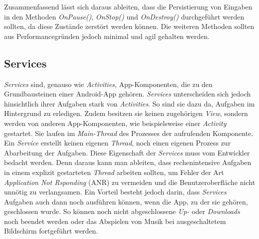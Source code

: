 Zusammenfassend lässt sich daraus ableiten, dass die Persistierung von Eingaben in den Methoden \textit{OnPause()}, \textit{OnStop()} und \textit{OnDestroy()} durchgeführt werden sollten, da diese Zustände zerstört werden können. Die weiteren Methoden sollten aus Performancegründen jedoch minimal und agil gehalten werden.
\subsection{Services}
\label{ssec:android-services}
\textit{Services} sind, genauso wie \textit{Activities}, App-Komponenten, die zu den Grundbausteinen einer Android-App gehören. \textit{Services} unterscheiden sich jedoch hinsichtlich ihrer Aufgaben stark von \textit{Activities}. So sind sie dazu da, Aufgaben im Hintergrund zu erledigen. Zudem besitzen sie keinen zugehörigen \textit{View}, sondern werden von anderen App-Komponenten, wie beispielsweise einer \textit{Activity} gestartet. Sie laufen im \textit{Main-Thread} des Prozesses der aufrufenden Komponente. Ein \textit{Service} erstellt keinen eigenen \textit{Thread}, noch einen eigenen Prozess zur Abarbeitung der Aufgaben. Diese Eigenschaft der \textit{Services} muss vom Entwickler bedacht werden. Denn daraus kann man ableiten, dass rechenintensive Aufgaben in einem explizit gestarteten \textit{Thread} arbeiten sollten, um Fehler der Art \textit{Application Not Rsponding} (ANR) zu vermeiden und die Benutzeroberfläche nicht unnötig zu verlangsamen. Ein Vorteil besteht jedoch darin, dass \textit{Services} Aufgaben auch dann noch ausführen können, wenn die App, zu der sie gehören, geschlossen wurde. So können noch nicht abgeschlossene \textit{Up-} oder \textit{Downloads} noch beendet werden oder das Abspielen von Musik bei ausgeschaltetem Bildschirm fortgeführt werden.\\
